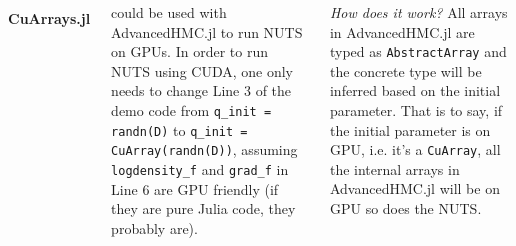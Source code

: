 \documentclass[
    17pt,
    margin=1in,
    innermargin=-4.5in,
    blockverticalspace=-0.15in
]{tikzposter}
\begin{document}
\begin{columns}
{    \paragraph{CuArrays.jl} could be used with AdvancedHMC.jl to run NUTS on GPUs.
    In order to run NUTS using CUDA, 
    one only needs to change Line 3 of the demo code 
    from \texttt{q\_init = randn(D)} to \texttt{q\_init = CuArray(randn(D))}, 
    assuming \texttt{logdensity\_f} and \texttt{grad\_f} in Line 6 are GPU friendly 
    (if they are pure Julia code, they probably are).
    
    \textit{How does it work?}
    All arrays in AdvancedHMC.jl are typed as \texttt{AbstractArray} and
    the concrete type will be inferred based on the initial parameter.
    That is to say, if the initial parameter is on GPU, i.e. it's a \texttt{CuArray},
    all the internal arrays in AdvancedHMC.jl will be on GPU so does the NUTS.
}


    
\end{columns}
\end{document}
